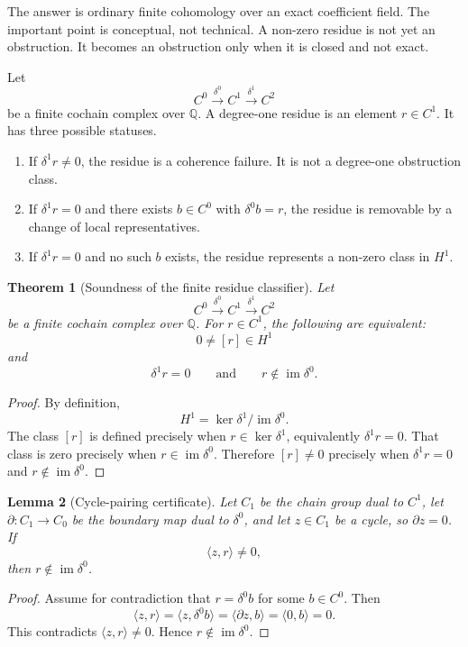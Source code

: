\documentclass[11pt]{article}
\newtheorem{theorem}{Theorem}[section]
\newtheorem{lemma}[theorem]{Lemma}
\newcommand{\im}{\operatorname{im}}
\newcommand{\Q}{\mathbb{Q}}
\begin{document}
The answer is ordinary finite cohomology over an exact coefficient field. The important point is conceptual, not technical. A non-zero residue is not yet an obstruction. It becomes an obstruction only when it is closed and not exact.

Let
\[
C^0\xrightarrow{\delta^0}C^1\xrightarrow{\delta^1}C^2
\]
be a finite cochain complex over \(\Q\). A degree-one residue is an element \(r\in C^1\). It has three possible statuses.

\begin{enumerate}[label=(\arabic*)]
\item If \(\delta^1r\neq 0\), the residue is a coherence failure. It is not a degree-one obstruction class.
\item If \(\delta^1r=0\) and there exists \(b\in C^0\) with \(\delta^0b=r\), the residue is removable by a change of local representatives.
\item If \(\delta^1r=0\) and no such \(b\) exists, the residue represents a non-zero class in \(H^1\).
\end{enumerate}

\begin{theorem}[Soundness of the finite residue classifier]\label{thm:classifier-soundness}
Let
\[
C^0\xrightarrow{\delta^0}C^1\xrightarrow{\delta^1}C^2
\]
be a finite cochain complex over \(\Q\). For \(r\in C^1\), the following are equivalent:
\[
0\neq [r]\in H^1
\]
and
\[
\delta^1r=0
\qquad\text{and}\qquad
r\notin \im\delta^0.
\]
\end{theorem}

\begin{proof}
By definition,
\[
H^1=\ker \delta^1/\im\delta^0.
\]
The class \([r]\) is defined precisely when \(r\in \ker\delta^1\), equivalently \(\delta^1r=0\). That class is zero precisely when \(r\in \im\delta^0\). Therefore \([r]\neq 0\) precisely when \(\delta^1r=0\) and \(r\notin\im\delta^0\).
\end{proof}

\begin{lemma}[Cycle-pairing certificate]\label{lem:cycle-pairing}
Let \(C_1\) be the chain group dual to \(C^1\), let \(\partial:C_1\to C_0\) be the boundary map dual to \(\delta^0\), and let \(z\in C_1\) be a cycle, so \(\partial z=0\). If
\[
\langle z,r\rangle\neq 0,
\]
then \(r\notin \im\delta^0\).
\end{lemma}

\begin{proof}
Assume for contradiction that \(r=\delta^0b\) for some \(b\in C^0\). Then
\[
\langle z,r\rangle
=
\langle z,\delta^0b\rangle
=
\langle \partial z,b\rangle
=
\langle 0,b\rangle
=0.
\]
This contradicts \(\langle z,r\rangle\neq 0\). Hence \(r\notin \im\delta^0\).
\end{proof}
\end{document}

